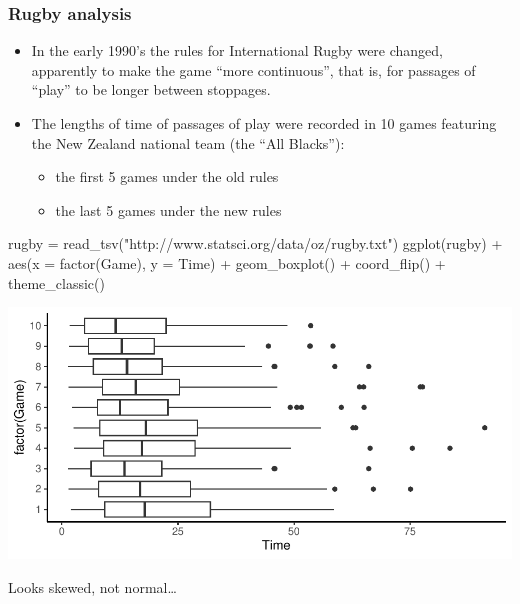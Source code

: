 \documentclass[a4paper]{article}
\begin{document}
\subsubsection{Rugby analysis}
\begin{itemize}
	\item In the early 1990's the rules for International Rugby were changed, apparently to make the game ``more continuous'', that is, for passages of ``play'' to be longer between stoppages.
	\item The lengths of time of passages of play were recorded in 10 games featuring the New Zealand national team (the ``All Blacks''):
	\begin{itemize}
		\item the first 5 games under the old rules
		\item the last 5 games under the new rules
	\end{itemize}
\end{itemize}
\begin{Schunk}
\begin{Sinput}
rugby = read_tsv("http://www.statsci.org/data/oz/rugby.txt")
ggplot(rugby) + aes(x = factor(Game), y = Time) + 
  geom_boxplot() + coord_flip() +
  theme_classic()
\end{Sinput}


{\centering \includegraphics[width=\maxwidth]{figure/listings-unnamed-chunk-268-1} 

}

\end{Schunk}
Looks skewed, not normal\dots
\end{document}

